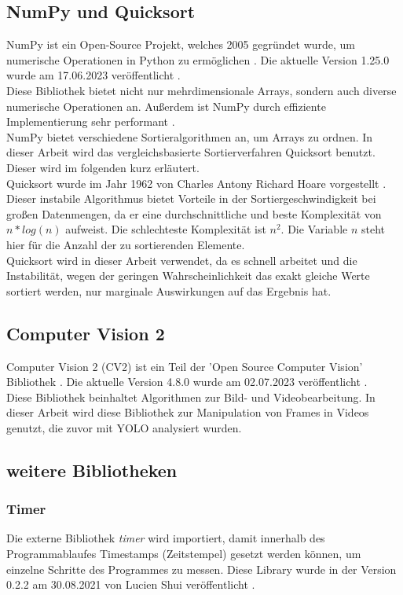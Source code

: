 		\subsection{NumPy und Quicksort}
		{ \label{subsec:NumPy}
		NumPy ist ein Open-Source Projekt, welches 2005 gegründet wurde, um numerische Operationen in Python zu ermöglichen \citep{numpy_about}. Die aktuelle Version 1.25.0 wurde am 17.06.2023 veröffentlicht \citep{numpy_main_web}. \\
		Diese Bibliothek bietet nicht nur mehrdimensionale Arrays, sondern auch diverse numerische Operationen an. Außerdem ist NumPy durch effiziente Implementierung sehr performant \citep{numpy_main_web}. \\

		NumPy bietet verschiedene Sortieralgorithmen an, um Arrays zu ordnen. In dieser Arbeit wird das vergleichsbasierte Sortierverfahren \glqq Quicksort\grqq{} benutzt. Dieser wird im folgenden kurz erläutert. \\
		Quicksort wurde im Jahr 1962 von Charles Antony Richard Hoare vorgestellt \citep{Hoare1962QS}. Dieser instabile Algorithmus bietet Vorteile in der Sortiergeschwindigkeit bei großen Datenmengen, da er eine durchschnittliche und beste Komplexität von $n*log(n)$ aufweist. Die schlechteste Komplexität ist $n^2$. Die Variable $n$ steht hier für die Anzahl der zu sortierenden Elemente. \\
		Quicksort wird in dieser Arbeit verwendet, da es schnell arbeitet und die Instabilität, wegen der geringen Wahrscheinlichkeit das exakt gleiche Werte sortiert werden, nur marginale Auswirkungen auf das Ergebnis hat.
		}

		\subsection{Computer Vision 2}
		{ \label{subsec:Computer_Vision_2}
		Computer Vision 2 (CV2) ist ein Teil der 'Open Source Computer Vision' Bibliothek \citep{opencv_about}. Die aktuelle Version 4.8.0 wurde am 02.07.2023 veröffentlicht \citep{opencv_release}. \\
		Diese Bibliothek beinhaltet Algorithmen zur Bild- und Videobearbeitung. In dieser Arbeit wird diese Bibliothek zur Manipulation von Frames in Videos genutzt, die zuvor mit YOLO analysiert wurden. 
		}
		\subsection{weitere Bibliotheken}
		\subsubsection{Timer}	
		{Die externe Bibliothek \textit{timer} wird importiert, damit innerhalb des Programmablaufes Timestamps (Zeitstempel) gesetzt werden können, um einzelne Schritte des Programmes zu messen. Diese Library wurde in der Version 0.2.2 am 30.08.2021 von Lucien Shui veröffentlicht \citep{Shui2021}. }
